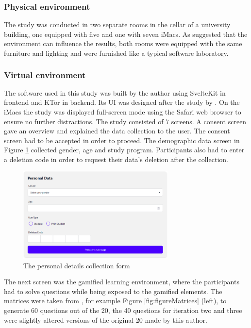 \subsubsection{Physical environment}
The study was conducted in two separate rooms in the cellar of a university building, one equipped with five and one with seven iMacs.
As \textcite{christyLeaderboardsVirtualClassroom2014} suggested that the environment can influence the results, both rooms were equipped with the same furniture and lighting and were furnished like a typical software laboratory.

\subsubsection{Virtual environment}
The software used in this study was built by the author using SvelteKit in frontend and KTor in backend. Its UI was designed after the study by \textcite{albuquerqueDoesGenderStereotype2017}.
On the iMacs the study was displayed full-screen mode using the Safari web browser to ensure no further distractions. The study consisted of 7 screens.
A consent screen gave an overview and explained the data collection to the user. The consent screen had to be accepted in order to proceed.
The demographic data screen in Figure \ref{fig:figureDetails} collected gender, age and study program. Participants also had to enter a deletion code in order to request their data's deletion after the collection.
\begin{figure}[H]
  \centering
  \includegraphics[width=0.7\textwidth]{img/details.png}
  \caption{The personal details collection form}
  \label{fig:figureDetails}
\end{figure}
The next screen was the gamified learning environment, where the participants had to solve questions while being exposed to the gamified elements.
The matrices were taken from \textcite{albuquerqueDoesGenderStereotype2017}, for example Figure \ref{fig:figureMatrices} (left), to generate 60 questions out of the 20, the 40 questions for iteration two and three were slightly altered versions of the original 20 made by this author.
